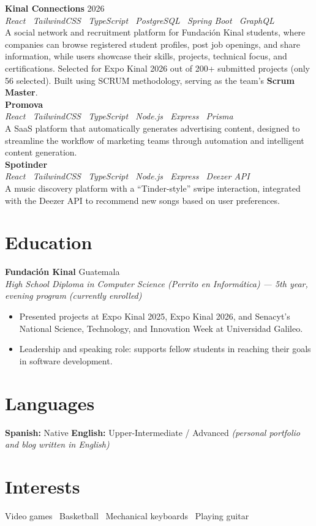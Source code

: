 \documentclass[10.5pt,a4paper]{article}
\newcommand{\projectitem}[4]{%
  \textbf{\color{darknavy}#1} \hfill {\small\color{graytext}#2}\\
  {\small\color{accent}\textit{#3}}\\[2pt]
  #4\\[6pt]
}
\begin{document}
\projectitem{Kinal Connections}{2026}
{React \textbar\ TailwindCSS \textbar\ TypeScript \textbar\ PostgreSQL \textbar\ Spring Boot \textbar\ GraphQL}
{A social network and recruitment platform for Fundación Kinal students, where companies can browse registered student profiles, post job openings, and share information, while users showcase their skills, projects, technical focus, and certifications. Selected for Expo Kinal 2026 out of 200+ submitted projects (only 56 selected). Built using SCRUM methodology, serving as the team's \textbf{Scrum Master}.}

\projectitem{Promova}{}
{React \textbar\ TailwindCSS \textbar\ TypeScript \textbar\ Node.js \textbar\ Express \textbar\ Prisma}
{A SaaS platform that automatically generates advertising content, designed to streamline the workflow of marketing teams through automation and intelligent content generation.}

\projectitem{Spotinder}{}
{React \textbar\ TailwindCSS \textbar\ TypeScript \textbar\ Node.js \textbar\ Express \textbar\ Deezer API}
{A music discovery platform with a ``Tinder-style'' swipe interaction, integrated with the Deezer API to recommend new songs based on user preferences.}

\section*{Education}
\textbf{\color{darknavy}Fundación Kinal} \hfill {\small\color{graytext}Guatemala}\\
{\small\color{accent}\textit{High School Diploma in Computer Science (Perrito en Informática) --- 5th year, evening program (currently enrolled)}}\\[3pt]
\begin{itemize}[leftmargin=14pt, itemsep=1pt, topsep=3pt]
  \item Presented projects at Expo Kinal 2025, Expo Kinal 2026, and Senacyt's National Science, Technology, and Innovation Week at Universidad Galileo.
  \item Leadership and speaking role: supports fellow students in reaching their goals in software development.
\end{itemize}

\section*{Languages}
\textbf{\color{darknavy}Spanish:} Native \quad\textbar\quad \textbf{\color{darknavy}English:} Upper-Intermediate / Advanced \textit{(personal portfolio and blog written in English)}

\section*{Interests}
Video games \textbullet\ Basketball \textbullet\ Mechanical keyboards \textbullet\ Playing guitar
\end{document}
